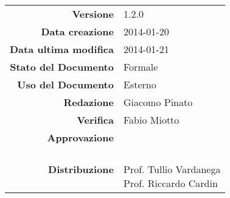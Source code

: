 
\newcommand{\Versione}{1.2.0}						%
\newcommand{\Data}{2014-01-20}						%
\newcommand{\DataUltimaModifica}{2014-01-21}
\newcommand{\TipoDocumento}{Verbale esterno 2014-01-20}		%




\begin{center}
\begin{tabular}{r|l}
\textbf{Versione} & \Versione{} \\
\textbf{Data creazione} & \Data{} \\
\textbf{Data ultima modifica} & \DataUltimaModifica{} \\
\textbf{Stato del Documento} & Formale \\		%
\textbf{Uso del Documento} & Esterno \\			%
\textbf{Redazione} & Giacomo Pinato\\				%
\textbf{Verifica} & Fabio Miotto\\		%
\textbf{Approvazione} & \\		%
\textbf{Distribuzione} & \parbox[t]{4cm}{\NomeGruppo{} \\Prof. Tullio Vardanega \\ Prof. Riccardo Cardin \\ \Prop{} }\\
\end{tabular}
\end{center}

\vspace{0.05in}

\begin{abstract}
\begin{center}
Verbale della riunione tra i componenti del gruppo \NomeGruppo{} per il progetto \\ \Progetto{}, avvenuta in data 2014-01-20.
\end{center}
\end{abstract}


